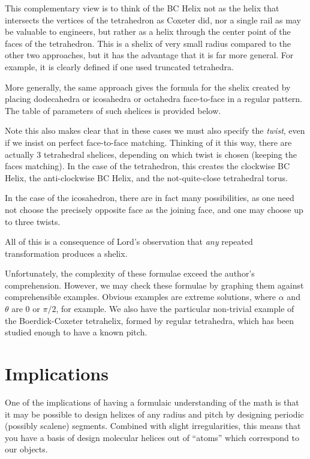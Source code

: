 \documentclass[11pt]{article}
\begin{document}
{This complementary view is to think of the BC Helix not as the helix that
intersects the vertices of the tetrahedron as Coxeter did\cite{coxeter1985simplicial}, nor a single
rail as may be valuable to engineers\cite{read2018transforming}, but rather as a helix through
the center point of the faces of the tetrahedron. This is a shelix of
very small radius compared to the other two approaches, but it has
the advantage that it is far more general. For example, it is
clearly defined if one used truncated tetrahedra.

More generally, the same approach gives the formula for the shelix
created by placing dodecahedra or icosahedra or octahedra face-to-face
in a regular pattern. The table of parameters of such shelices is provided
below.

Note this also makes clear that in these cases we must also specify the {\em twist},
even if we insist on perfect face-to-face matching. Thinking of it this
way, there are actually 3 tetrahedral shelices, depending on which twist
is chosen (keeping the faces matching). In the case of the tetrahedron,
this creates the clockwise BC Helix, the anti-clockwise BC Helix, and the
not-quite-close tetrahedral torus.

In the case of the icosahedron, there are in fact many possibilities,
as one need not choose the precisely opposite face as the joining face, and
one may choose up to three twists.

All of this is a consequence of Lord's observation that {\em any}
repeated transformation produces a shelix.

Unfortunately, the complexity of these formulae exceed the author's comprehension.
However, we may check these formulae by graphing them against comprehensible
examples. Obvious examples are extreme solutions, where $\alpha$  and $\theta$ are
$0$ or $\pi/2$, for example. We also have the particular non-trivial example
of the Boerdick-Coxeter tetrahelix, formed by regular tetrahedra, which has
been studied enough to have a known pitch.

\section{Implications}

One of the implications of having a formulaic understanding of the math
is that it may be possible to design helixes
of any radius and pitch by designing periodic (possibly scalene) segments. Combined with slight
irregularities, this means that you have a basis of design molecular helices
out of ``atoms'' which correspond to our objects.

}
\end{document}
